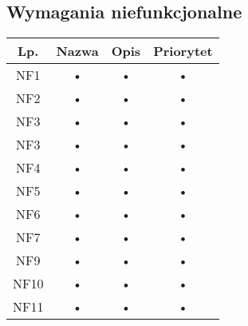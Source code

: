 \subsection{Wymagania niefunkcjonalne}

\begin{tabular}{|c|c|c|c|}
\hline 
Lp. & Nazwa & Opis & Priorytet \\ 
\hline 
NF1 & • & • & • \\ 
\hline 
NF2 & • & • & • \\ 
\hline 
NF3 & • & • & • \\ 
\hline 
NF3 & • & • & • \\ 
\hline 
NF4 & • & • & • \\ 
\hline 
NF5 & • & • & • \\ 
\hline 
NF6 & • & • & • \\ 
\hline 
NF7 & • & • & • \\ 
\hline 
NF9 & • & • & • \\ 
\hline 
NF10 & • & • & • \\ 
\hline 
NF11 & • & • & • \\ 
\hline 
\end{tabular}